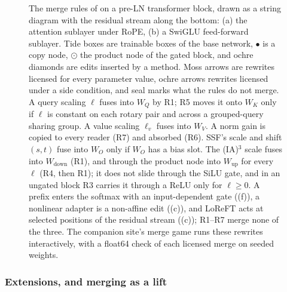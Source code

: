\begin{figure}[tbp]
\caption{The merge rules of  on a pre-LN transformer block, drawn as a string diagram with the
residual stream along the bottom: (a) the attention sublayer under RoPE, (b) a SwiGLU feed-forward sublayer. Tide boxes
are trainable boxes of the base network, $\bullet$ is a copy node, $\odot$ the product node of the gated block, and
ochre diamonds are edits inserted by a method. Moss arrows are rewrites licensed for every parameter value, ochre arrows
rewrites licensed under a side condition, and seal marks what the rules do not merge. A query scaling $\ell$ fuses into
$W_Q$ by R1; R5 moves it onto $W_K$ only if $\ell$ is constant on each rotary pair and across a grouped-query sharing
group. A value scaling $\ell_v$ fuses into $W_V$. A norm gain is copied to every reader (R7) and absorbed (R6). SSF's
scale and shift $(s,t)$ fuse into $W_O$ only if $W_O$ has a bias slot. The (IA)$^3$ scale fuses into
$W_{\mathrm{down}}$ (R1), and through the product node into $W_{\mathrm{up}}$ for every $\ell$ (R4, then R1); it does not
slide through the SiLU gate, and in an ungated block R3 carries it through a ReLU only for $\ell\ge0$. A prefix enters the
softmax with an input-dependent gate ((f)), a nonlinear adapter is a non-affine edit
((c)), and LoReFT acts at selected positions of the residual stream
((c)); R1--R7 merge none of the three. The companion site's merge game runs these rewrites
interactively, with a float64 check of each licensed merge on seeded weights.}\label{fig:merge}
\end{figure}

\subsubsection{Extensions, and merging as a lift}\label{sec:merge-extensions}

